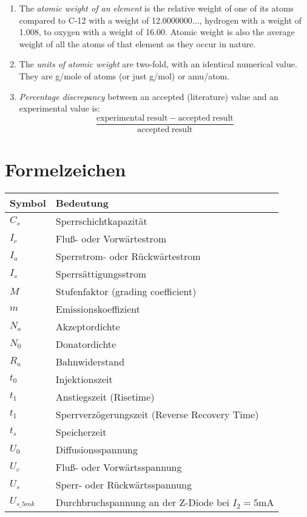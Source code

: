 \documentclass[
	a4paper, %
	12pt, %
]{CSUniSchoolLabReport}
\begin{document}
\begin{enumerate}
	\item The \textit{atomic weight of an element} is the relative weight of one of its atoms compared to C-12 with a weight of 12.0000000$\ldots$, hydrogen with a weight of 1.008, to oxygen with a weight of 16.00. Atomic weight is also the average weight of all the atoms of that element as they occur in nature.
	\item The \textit{units of atomic weight} are two-fold, with an identical numerical value. They are g/mole of atoms (or just g/mol) or amu/atom.
	\item \textit{Percentage discrepancy} between an accepted (literature) value and an experimental value is:
		\begin{equation*}
			\frac{\mathrm{experimental\;result} - \mathrm{accepted\;result}}{\mathrm{accepted\;result}}
		\end{equation*}
\end{enumerate}


\section{Formelzeichen}
\begin{table}[h]
\centering
\begin{tabular}{ll}
\toprule
\textbf{Symbol} & \textbf{Bedeutung} \\
\midrule
$C_s$    & Sperrschichtkapazität \\
$I_c$    & Fluß- oder Vorwärtestrom \\
$I_a$    & Sperrstrom- oder Rückwärtestrom \\
$I_s$    & Sperrsättigungsstrom \\
$M$      & Stufenfaktor (grading coefficient) \\
$m$      & Emissionskoeffizient \\
$N_a$    & Akzeptordichte \\
$N_0$    & Donatordichte \\
$R_a$    & Bahnwiderstand \\
$t_0$    & Injektionszeit \\
$t_1$    & Anstiegszeit (Risetime) \\
$t_1$    & Sperrverzögerungszeit (Reverse Recovery Time) \\
$t_s$    & Speicherzeit \\
$U_0$    & Diffusionsspannung \\
$U_c$    & Fluß- oder Vorwärtsspannung \\
$U_s$    & Sperr- oder Rückwärtsspannung \\
$U_{s\_5mk}$ & Durchbruchspannung an der Z-Diode bei $I_2 = 5$mA \\
\bottomrule
\end{tabular}
\end{table}

\printbibliography %

\end{document}
